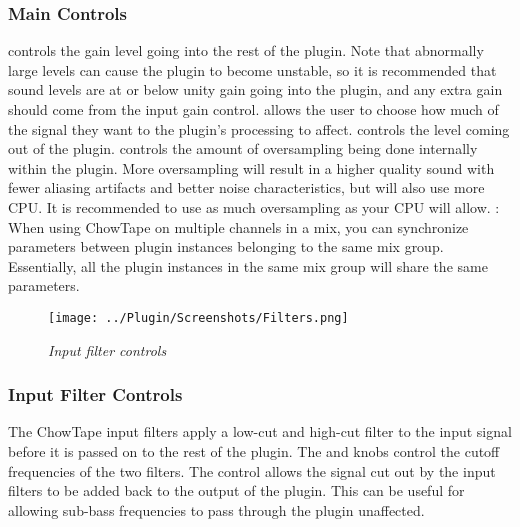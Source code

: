 \documentclass[landscape,twocolumn,a5paper]{manual}
\begin{document}
\subsubsection{Main Controls}
 controls the gain level going into
the rest of the plugin. Note that abnormally large levels
can cause the plugin to become unstable, so it is recommended
that sound levels are at or below unity gain going into the
plugin, and any extra gain should come from the input gain
control.
\newpar
{} allows the user to choose how much of the
signal they want to the plugin's processing to affect.
\newpar
{} controls the level coming out of the plugin.
\newpar
{} controls the amount of oversampling
being done internally within the plugin. More oversampling
will result in a higher quality sound with fewer aliasing
artifacts and better noise characteristics, but will also
use more CPU. It is recommended to use as much oversampling
as your CPU will allow.
\newpar
{}: When using ChowTape on multiple channels
in a mix, you can synchronize parameters between plugin
instances belonging to the same mix group. Essentially, all
the plugin instances in the same mix group will share the same
parameters.

\begin{figure}[ht]
    \center
    \texttt{[image: ../Plugin/Screenshots/Filters.png]}
    \caption{\label{h_inputs}{\it Input filter controls}}
\end{figure}

\subsubsection{Input Filter Controls}
The ChowTape input filters apply a low-cut and high-cut filter
to the input signal before it is passed on to the rest of the
plugin. The  and  knobs
control the cutoff frequencies of the two filters. The
 control allows the signal cut out by the
input filters to be added back to the output of the plugin.
This can be useful for allowing sub-bass frequencies to pass
through the plugin unaffected.
\end{document}
